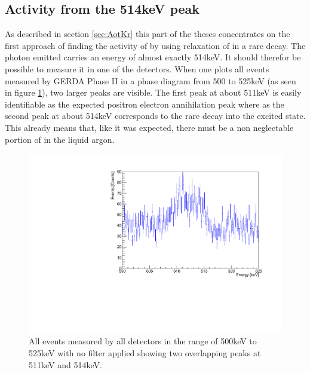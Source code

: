  
\subsection{Activity from the 514keV peak}
\label{sec:SAfrom514}

As described in section \ref{sec:AotKr} this part of the theses concentrates on the first approach of finding the activity of  by using relaxation of  in a rare decay. 
The photon emitted carries an energy of almost exactly 514keV. 
It should therefor be possible to measure it in one of the detectors. 
When one plots all events measured by GERDA Phase II in a phase diagram from 500 to 525keV (as seen in figure \ref{fig:ungefiltertes500525}), two larger peaks are visible. 
The first peak at about 511keV is easily identifiable as the expected positron electron annihilation peak where as the second peak at about 514keV corresponds to the rare  decay into the excited  state. 
This already means that, like it was expected, there must be a non neglectable portion of  in the liquid argon.
\\

\begin{figure}[t!]
	\centering
	\ifmakefigures%
	\includegraphics[width=130mm]{./Bilder/GraphNoFiltersAtAllAll.pdf}
	\fi%
	\caption{\label{fig:ungefiltertes500525}
		All events measured by all detectors in the range of 500keV to 525keV with no filter applied showing two overlapping peaks at 511keV and 514keV.
	}
\end{figure}



